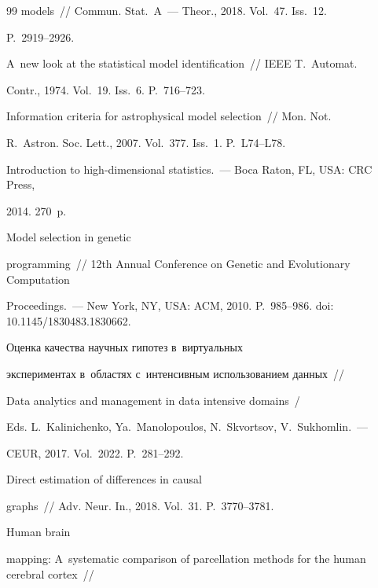 {{\begin{thebibliography}{99}
models~/\!\!/ Commun. Stat.~A~--- Theor., 2018. Vol.~47. Iss.~12. 

P.~2919--2926.


 A~new look at the statistical model identification~/\!\!/ IEEE T.~Automat. 

Contr., 1974. Vol.~19. Iss.~6. P.~716--723.


 Information criteria for astrophysical model selection~/\!\!/ Mon. Not. 

R.~Astron. Soc. Lett., 2007. Vol.~377. Iss.~1. P.~L74--L78.


 Introduction to high-dimensional statistics.~--- Boca Raton, FL, USA: CRC Press, 

2014. 270~p.


 Model selection in genetic 

programming~/\!\!/ 12th Annual Conference on Genetic and Evolutionary Computation 

Proceedings.~--- New York, NY, USA: ACM, 2010. P.~985--986. doi: 10.1145/1830483.1830662.


 Оценка качества научных гипотез в~виртуальных

 экспериментах в~областях с~интенсивным использованием данных~/\!\!/ 

 Data analytics and management in data intensive domains~/

 Eds. L.~Kalinichenko, Ya.~Manolopoulos, N.~Skvortsov, V.~Sukhomlin.~--- 

CEUR, 2017. Vol.~2022. P.~281--292.


 Direct estimation of differences in causal 

graphs~/\!\!/ Adv. Neur. In., 2018. Vol.~31. P.~3770--3781.


 Human brain 

mapping: A~systematic comparison of parcellation methods for the human cerebral cortex~/\!\!/ 


\end{thebibliography}}}
